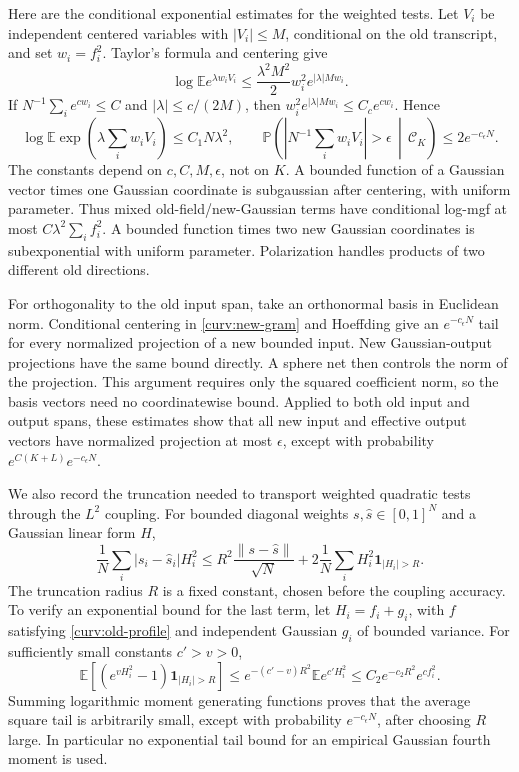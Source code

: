 \documentclass[11pt,reqno]{amsart}
\begin{document}
Here are the conditional exponential estimates for the weighted tests.
Let $V_i$ be independent centered variables with $|V_i|\le M$, conditional
on the old transcript, and set $w_i=f_i^2$. Taylor's formula and centering
give
\[
 \log\mathbb E e^{\lambda w_iV_i}
  \le \frac{\lambda^2M^2}{2}w_i^2e^{|\lambda|Mw_i}.
\]
If $N^{-1}\sum_i e^{cw_i}\le C$ and
$|\lambda|\le c/(2M)$, then
$w_i^2e^{|\lambda|Mw_i}\le C_c e^{cw_i}$. Hence
\begin{equation*}
 \log\mathbb E\exp\left(\lambda\sum_iw_iV_i\right)
             \le C_1N\lambda^2,
 \qquad
 \mathbb P\left(\left|N^{-1}\sum_iw_iV_i\right|>\epsilon
                          \,\middle|\,\mathcal C_K\right)
             \le2e^{-c_\epsilon N}.
\end{equation*}
The constants depend on $c,C,M,\epsilon$, not on $K$. A bounded function
of a Gaussian vector times one Gaussian coordinate is subgaussian after
centering, with uniform parameter. Thus mixed old-field/new-Gaussian
terms have conditional log-mgf at most
$C\lambda^2\sum_i f_i^2$. A bounded function times two new Gaussian
coordinates is subexponential with uniform parameter. Polarization
handles products of two different old directions.

For orthogonality to the old input span, take an orthonormal basis in
Euclidean norm. Conditional centering in \eqref{curv:new-gram} and
Hoeffding give an $e^{-c_\epsilon N}$ tail for every normalized projection
of a new bounded input. New Gaussian-output projections have the same
bound directly. A sphere net then controls the norm of the projection.
This argument requires only the squared coefficient norm, so the basis
vectors need no coordinatewise bound. Applied to both old input and
output spans, these estimates show that all new input and effective
output vectors have normalized projection at most $\epsilon$, except
with probability $e^{C(K+L)}e^{-c_\epsilon N}$.

We also record the truncation needed to transport weighted quadratic
tests through the $L^2$ coupling. For bounded diagonal weights
$s,\widehat s\in[0,1]^N$ and a Gaussian linear form $H$,
\begin{equation}\label{curv:weight-truncation}
 \frac1N\sum_i|s_i-\widehat s_i|H_i^2
 \le R^2\frac{\|s-\widehat s\|}{\sqrt N}
          +2\frac1N\sum_iH_i^2\mathbf1_{|H_i|>R}.
\end{equation}
The truncation radius $R$ is a fixed constant, chosen before the coupling
accuracy. To verify an exponential bound for the last term, let
$H_i=f_i+g_i$, with $f$ satisfying \eqref{curv:old-profile} and independent
Gaussian $g_i$ of bounded variance. For sufficiently small constants
$c'>v>0$,
\[
 \mathbb E[(e^{vH_i^2}-1)\mathbf1_{|H_i|>R}]
 \le e^{-(c'-v)R^2}\mathbb E e^{c'H_i^2}
 \le C_2e^{-c_2R^2}e^{cf_i^2}.
\]
Summing logarithmic moment generating functions proves that the average
square tail is arbitrarily small, except with probability $e^{-c_\epsilon
N}$, after choosing $R$ large. In particular no exponential tail bound
for an empirical Gaussian fourth moment is used.
\end{document}
